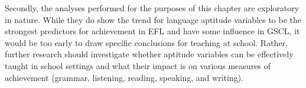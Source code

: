 \documentclass[output=paper]{langsci/langscibook}
\begin{document}
Secondly, the analyses performed for the purposes of this chapter are exploratory in nature. While they do show the trend for language aptitude variables to be the strongest predictors for achievement in EFL and have some influence in GSCL, it would be too early to draw specific conclusions for teaching at school. Rather, further research should investigate whether aptitude variables can be effectively taught in school settings and what their impact is on various measures of achievement (grammar, listening, reading, speaking, and writing).
\sloppy\printbibliography[heading=subbibliography,notkeyword=this]
\end{document}
